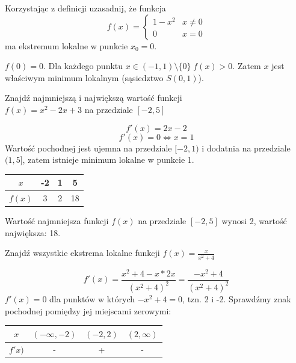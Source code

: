 \documentclass[12pt]{article}
\begin{document}
        \begin{exercise}
            Korzystając z definicji uzasadnij, że funkcja 
                $$f(x) = \begin{cases}
                        1 - x^2 & x \neq 0 \\
                        0 & x = 0
                        \end{cases}$$
            ma ekstremum lokalne w punkcie $x_0 = 0$.
        \end{exercise}
        
        $f(0) = 0$. Dla każdego punktu $x \in (-1, 1) \setminus \{0\}\;  f(x) > 0$. Zatem $x$ jest właściwym minimum lokalnym (sąsiedztwo $S(0, 1)$).
        
        \begin{exercise}
            Znajdź najmniejszą i największą wartość funkcji\\ $f(x) = x^2 - 2x + 3$ na przedziale $[-2, 5]$
        \end{exercise}

        $$f'(x) = 2x - 2$$ 
        $$f'(x) = 0 \Leftrightarrow x = 1$$
        Wartość pochodnej jest ujemna na przedziale $[-2, 1)$ i dodatnia na przedziale $(1, 5]$, zatem istnieje minimum lokalne w punkcie 1.
        
        \begin{center}
            \begin{tabular}{c||c|c|c}
                 $x$ & -2 & 1 & 5 \\
                 \hline
                 $f(x)$ & 3 & 2 & 18 \\   
            \end{tabular}
        \end{center}

        Wartość najmniejsza funkcji $f(x)$ na przedziale $[-2, 5]$ wynosi 2, wartość największa: 18.

        
        \begin{exercise}
            Znajdź wszystkie ekstrema lokalne funkcji $f(x) = \frac{x}{x^2 + 4}$
        \end{exercise}
        
        $$f'(x) = \frac{x^2 + 4 - x * 2x}{(x^2 + 4)^2} = \frac{-x^2 + 4}{(x^2 + 4)^2}$$
        $f'(x) = 0$ dla punktów w których $-x^2 + 4 = 0$, tzn. 2 i -2. Sprawdźmy znak pochodnej pomiędzy jej miejscami zerowymi:
    
        \begin{center}
            \begin{tabular}{c||c|c|c}
                $x$ &$(-\infty, -2)$ & $(-2, 2)$ & $(2, \infty)$ \\
                \hline
                $f'x)$ & - & + & -
            \end{tabular}
        \end{center}
        
\end{document}
